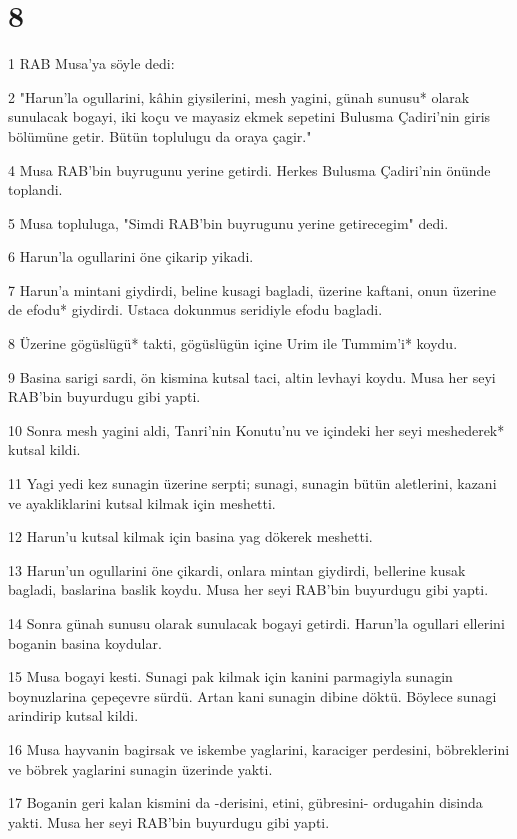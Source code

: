 \chapter{8}

\par 1 RAB Musa'ya söyle dedi:
\par 2 "Harun'la ogullarini, kâhin giysilerini, mesh yagini, günah sunusu* olarak sunulacak bogayi, iki koçu ve mayasiz ekmek sepetini Bulusma Çadiri'nin giris bölümüne getir. Bütün toplulugu da oraya çagir."
\par 4 Musa RAB'bin buyrugunu yerine getirdi. Herkes Bulusma Çadiri'nin önünde toplandi.
\par 5 Musa topluluga, "Simdi RAB'bin buyrugunu yerine getirecegim" dedi.
\par 6 Harun'la ogullarini öne çikarip yikadi.
\par 7 Harun'a mintani giydirdi, beline kusagi bagladi, üzerine kaftani, onun üzerine de efodu* giydirdi. Ustaca dokunmus seridiyle efodu bagladi.
\par 8 Üzerine gögüslügü* takti, gögüslügün içine Urim ile Tummim'i* koydu.
\par 9 Basina sarigi sardi, ön kismina kutsal taci, altin levhayi koydu. Musa her seyi RAB'bin buyurdugu gibi yapti.
\par 10 Sonra mesh yagini aldi, Tanri'nin Konutu'nu ve içindeki her seyi meshederek* kutsal kildi.
\par 11 Yagi yedi kez sunagin üzerine serpti; sunagi, sunagin bütün aletlerini, kazani ve ayakliklarini kutsal kilmak için meshetti.
\par 12 Harun'u kutsal kilmak için basina yag dökerek meshetti.
\par 13 Harun'un ogullarini öne çikardi, onlara mintan giydirdi, bellerine kusak bagladi, baslarina baslik koydu. Musa her seyi RAB'bin buyurdugu gibi yapti.
\par 14 Sonra günah sunusu olarak sunulacak bogayi getirdi. Harun'la ogullari ellerini boganin basina koydular.
\par 15 Musa bogayi kesti. Sunagi pak kilmak için kanini parmagiyla sunagin boynuzlarina çepeçevre sürdü. Artan kani sunagin dibine döktü. Böylece sunagi arindirip kutsal kildi.
\par 16 Musa hayvanin bagirsak ve iskembe yaglarini, karaciger perdesini, böbreklerini ve böbrek yaglarini sunagin üzerinde yakti.
\par 17 Boganin geri kalan kismini da -derisini, etini, gübresini- ordugahin disinda yakti. Musa her seyi RAB'bin buyurdugu gibi yapti.
